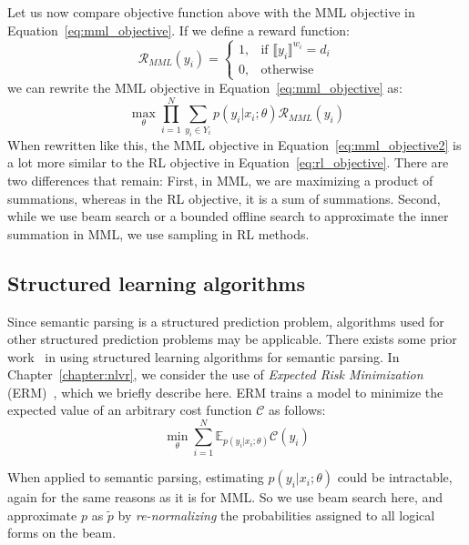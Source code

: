 Let us now compare objective function above with the MML objective in
Equation~\ref{eq:mml_objective}. If we define a reward function:
\begin{equation}
	\mathcal{R}_{MML}(y_i) = 
	\begin{cases}
		1, & \text{if } \llbracket y_i \rrbracket^{w_i} = d_i\\
		0, & \text{otherwise}
	\end{cases}
	\label{eq:mml_reward}
\end{equation}
we can rewrite the MML objective in Equation~\ref{eq:mml_objective} as:
\begin{equation}	
	\max_{\theta} \prod_{i=1}^N \sum_{y_i \in Y_i} p(y_i|x_i;\theta)
	\mathcal{R}_{MML}(y_i)
	\label{eq:mml_objective2}
\end{equation}
When rewritten like this, the MML objective in Equation~\ref{eq:mml_objective2} is a lot more
similar to the RL objective in Equation~\ref{eq:rl_objective}. There are two
differences that remain: First, in MML, we are maximizing a product of summations,
whereas in the RL objective, it is a sum of summations. Second, while we use
beam search or a bounded offline search to approximate the inner summation in
MML, we use sampling in RL methods.

\subsection{Structured learning algorithms}\label{sec:erm}
Since semantic parsing is a structured prediction problem, algorithms used for
other structured prediction problems may be applicable. 
There exists some prior work~\citep{IyyerSQA2016,guu2017bridging} in using 
structured learning algorithms for semantic parsing. In
Chapter~\ref{chapter:nlvr}, we consider the use of
\emph{Expected Risk Minimization} (ERM)~\citep{smith2006minimum}, which we
briefly describe here.  ERM trains a model to minimize the
expected value of an arbitrary cost function $\mathcal{C}$ as follows:
\begin{equation}
\min_{\theta} \sum_{i=1}^{N} \mathbb{E}_{p(y_i|x_i;
\theta)}\mathcal{C}(y_i) \label{eq:erm_objective}
\end{equation}

\noindent When applied to semantic parsing, estimating $p(y_i|x_i; \theta)$
could be intractable, again for the same reasons as it is for MML\@. So we use
beam search here, and approximate $p$ as $\tilde{p}$ by \emph{re-normalizing}
the probabilities assigned to all logical forms on the beam.

